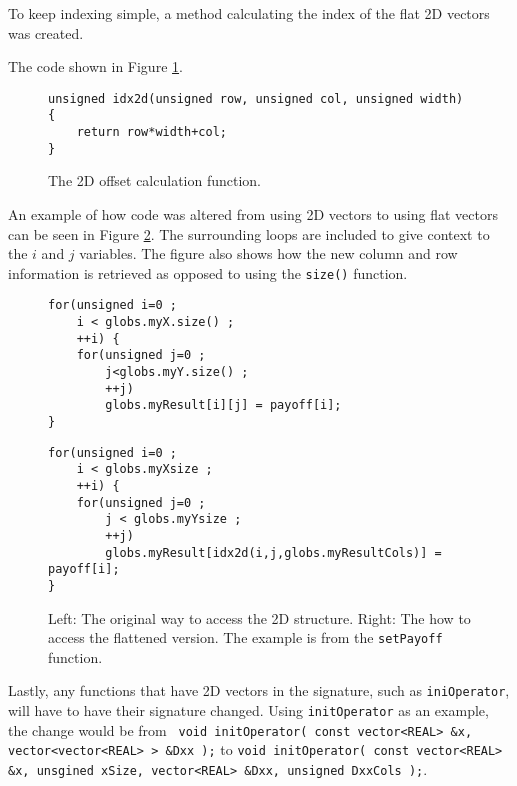 To keep indexing simple, a method calculating the index of the flat 2D vectors was created.

The code shown in Figure \ref{code:idx2d}.
\begin{figure}[H]
    \begin{lstlisting}
unsigned idx2d(unsigned row, unsigned col, unsigned width) {
    return row*width+col;
}
    \end{lstlisting}
    \caption{The 2D offset calculation function.}
    \label{code:idx2d}
\end{figure}

An example of how code was altered from using 2D vectors to using flat
vectors can be seen in Figure \ref{code:2dto1dcoord}. The surrounding loops are
included to give context to the $i$ and $j$ variables. The figure also shows how
the new column and row information is retrieved as opposed to using the
\texttt{size()} function.

\begin{figure}[H]
    \begin{minipage}{.45\textwidth}
        \begin{lstlisting}
for(unsigned i=0 ;
    i < globs.myX.size() ;
    ++i) {
    for(unsigned j=0 ;
        j<globs.myY.size() ;
        ++j) 
        globs.myResult[i][j] = payoff[i];
}
        \end{lstlisting}
    \end{minipage}\hfill
    \begin{minipage}{.45\textwidth}
        \begin{lstlisting}
for(unsigned i=0 ;
    i < globs.myXsize ;
    ++i) {
    for(unsigned j=0 ;
        j < globs.myYsize ;
        ++j) 
        globs.myResult[idx2d(i,j,globs.myResultCols)] = payoff[i];
}
        \end{lstlisting}
    \end{minipage}
    \caption{Left: The original way to access the 2D structure. Right: The how
    to access the flattened version. The example is from the
    \texttt{setPayoff} function.}
    \label{code:2dto1dcoord}
\end{figure}

Lastly, any functions that have 2D vectors in the signature, such as
\texttt{iniOperator}, will have to have their signature changed. Using
\texttt{initOperator} as an example, the change would be from \texttt{
void initOperator(  const vector<REAL> \&x, vector<vector<REAL> > \&Dxx );} to
\texttt{void initOperator(  const vector<REAL> \&x, unsgined xSize, vector<REAL>
\&Dxx, unsigned DxxCols );}.

